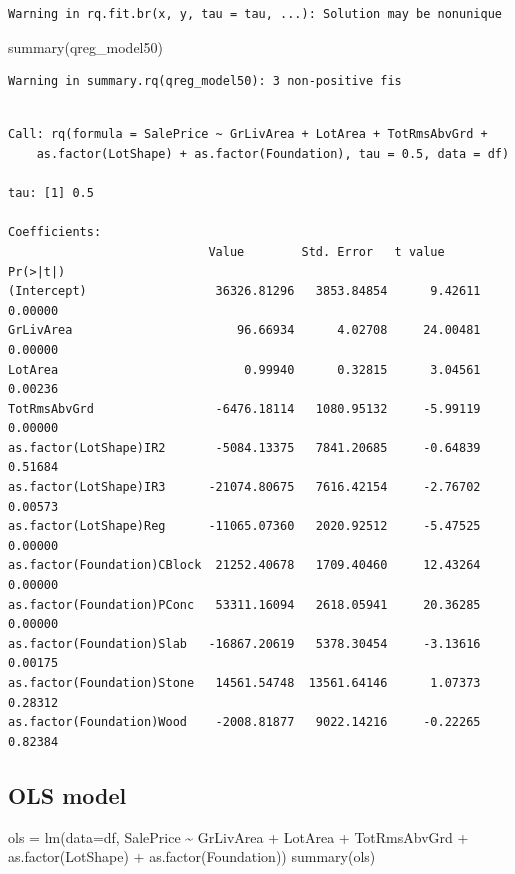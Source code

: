 \documentclass[
  letterpaper,
  DIV=11,
  numbers=noendperiod]{scrreprt}
\newenvironment{Shaded}{\begin{snugshade}}{\end{snugshade}}
\newcommand{\AttributeTok}[1]{\textcolor[rgb]{0.40,0.45,0.13}{#1}}
\newcommand{\FunctionTok}[1]{\textcolor[rgb]{0.28,0.35,0.67}{#1}}
\newcommand{\NormalTok}[1]{\textcolor[rgb]{0.00,0.23,0.31}{#1}}
\newcommand{\OtherTok}[1]{\textcolor[rgb]{0.00,0.23,0.31}{#1}}
\newcommand{\SpecialCharTok}[1]{\textcolor[rgb]{0.37,0.37,0.37}{#1}}
\begin{document}
\begin{verbatim}
Warning in rq.fit.br(x, y, tau = tau, ...): Solution may be nonunique
\end{verbatim}

\begin{Shaded}
\begin{Highlighting}[]
\FunctionTok{summary}\NormalTok{(qreg\_model50)}
\end{Highlighting}
\end{Shaded}

\begin{verbatim}
Warning in summary.rq(qreg_model50): 3 non-positive fis
\end{verbatim}

\begin{verbatim}

Call: rq(formula = SalePrice ~ GrLivArea + LotArea + TotRmsAbvGrd + 
    as.factor(LotShape) + as.factor(Foundation), tau = 0.5, data = df)

tau: [1] 0.5

Coefficients:
                            Value        Std. Error   t value      Pr(>|t|)    
(Intercept)                  36326.81296   3853.84854      9.42611      0.00000
GrLivArea                       96.66934      4.02708     24.00481      0.00000
LotArea                          0.99940      0.32815      3.04561      0.00236
TotRmsAbvGrd                 -6476.18114   1080.95132     -5.99119      0.00000
as.factor(LotShape)IR2       -5084.13375   7841.20685     -0.64839      0.51684
as.factor(LotShape)IR3      -21074.80675   7616.42154     -2.76702      0.00573
as.factor(LotShape)Reg      -11065.07360   2020.92512     -5.47525      0.00000
as.factor(Foundation)CBlock  21252.40678   1709.40460     12.43264      0.00000
as.factor(Foundation)PConc   53311.16094   2618.05941     20.36285      0.00000
as.factor(Foundation)Slab   -16867.20619   5378.30454     -3.13616      0.00175
as.factor(Foundation)Stone   14561.54748  13561.64146      1.07373      0.28312
as.factor(Foundation)Wood    -2008.81877   9022.14216     -0.22265      0.82384
\end{verbatim}

\hypertarget{ols-model}{%
\subsection{OLS model}\label{ols-model}}

\begin{Shaded}
\begin{Highlighting}[]
\NormalTok{ols }\OtherTok{=} \FunctionTok{lm}\NormalTok{(}\AttributeTok{data=}\NormalTok{df, SalePrice }\SpecialCharTok{\textasciitilde{}}\NormalTok{ GrLivArea }\SpecialCharTok{+}\NormalTok{ LotArea }\SpecialCharTok{+}\NormalTok{ TotRmsAbvGrd }\SpecialCharTok{+} \FunctionTok{as.factor}\NormalTok{(LotShape) }\SpecialCharTok{+} \FunctionTok{as.factor}\NormalTok{(Foundation))}
\FunctionTok{summary}\NormalTok{(ols)}
\end{Highlighting}
\end{Shaded}
\end{document}
